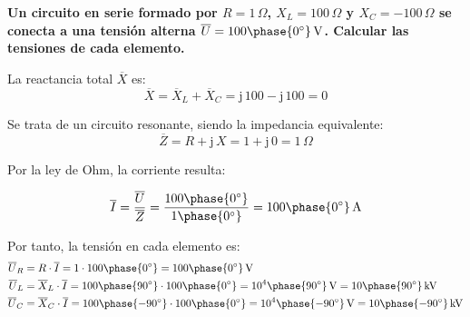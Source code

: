 	\vspace{4mm}
	\begin{example}\label{ej.2-4}
		\textbf{Un circuito en serie formado por $R=1\,\Omega$, ${X_L}=100\,\Omega$ y ${X_C}=-100\,\Omega$ se conecta a una tensión alterna $\overline{U}=100\phase{0^\circ}\,\si{\volt}$. Calcular las tensiones de cada elemento.}

  \vspace{4mm}
		La reactancia total $\overline{X}$ es:
		\begin{equation*}
			\overline{X}= \overline{X}_L+\overline{X}_C=\mathrm{j}\,100-\mathrm{j}\,100=0
		\end{equation*}
		
		Se trata de un circuito resonante, siendo la impedancia equivalente:
		\begin{equation*}
			\overline{Z}=R+\mathrm{j}\,X=1+\mathrm{j}\,0=1\,\Omega
		\end{equation*}
		
		Por la ley de Ohm, la corriente resulta:

        \vspace{-2mm}
		\begin{equation*}
			\overline{I}=\dfrac{\overline{U}}{\overline{Z}}=\dfrac{100\phase{0^\circ}}{1\phase{0^\circ}}=100\phase{0^\circ}\,\si{\ampere}
		\end{equation*}
		
		Por tanto, la tensión en cada elemento es: 
		\begin{align*}
			\overline{U}_R&=R\cdot\overline{I}=1\cdot 100\phase{0^\circ}=100\phase{0^\circ}\,\si{\volt}\\
			\overline{U}_L&=\overline{X}_L\cdot\overline{I}=100\phase{90^\circ}\cdot 100\phase{0^\circ}=10^4\phase{90^\circ}\,\si{\volt}=10\phase{90^\circ}\,\si{\kilo\volt}\\
			\overline{U}_C&=\overline{X}_C\cdot\overline{I}=100\phase{-90^\circ}\cdot 100\phase{0^\circ}=10^4\phase{-90^\circ}\,\si{\volt}=10\phase{-90^\circ}\,\si{\kilo\volt}
		\end{align*}
	\end{example}
	
	
